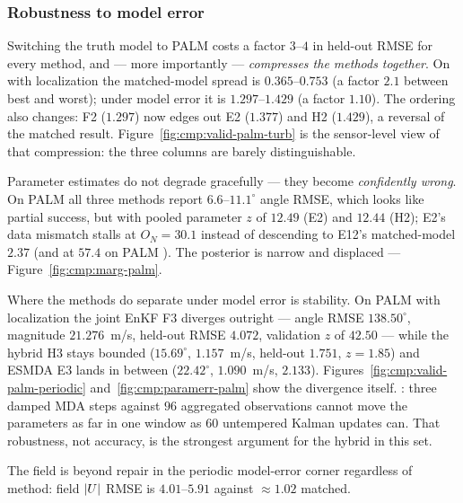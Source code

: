 \subsubsection{Robustness to model error}
\label{sec:cmp:modelerror}

Switching the truth model to PALM costs a factor $3$--$4$ in held-out RMSE for
every method, and --- more importantly --- \emph{compresses the methods
together}. On  with localization the matched-model spread
is $0.365$--$0.753$ (a factor $2.1$ between best and worst); under model error
it is $1.297$--$1.429$ (a factor $1.10$). The ordering also changes: F2
($1.297$) now edges out E2 ($1.377$) and H2 ($1.429$), a reversal of the
matched result. Figure~\ref{fig:cmp:valid-palm-turb} is the sensor-level view
of that compression: the three columns are barely distinguishable. 

Parameter estimates do not degrade gracefully --- they become
\emph{confidently wrong}. On PALM  all three methods report
$6.6$--$11.1^\circ$ angle RMSE, which looks like partial success, but with
pooled parameter $z$ of $12.49$ (E2) and $12.44$ (H2); E2's data mismatch
stalls at $O_N = 30.1$ instead of descending to E12's matched-model $2.37$ (and
at $57.4$ on PALM ). The posterior is narrow and displaced ---
Figure~\ref{fig:cmp:marg-palm}.

Where the methods do separate under model error is stability. On PALM
 with localization the joint EnKF F3 diverges outright --- angle
RMSE $138.50^\circ$, magnitude $21.276$~m/s, held-out RMSE $4.072$, validation
$z$ of $42.50$ --- while the hybrid H3 stays bounded ($15.69^\circ$,
$1.157$~m/s, held-out $1.751$, $z = 1.85$) and ESMDA E3 lands in between
($22.42^\circ$, $1.090$~m/s, $2.133$). Figures~\ref{fig:cmp:valid-palm-periodic}
and~\ref{fig:cmp:paramerr-palm} show the divergence itself. : three damped MDA steps
against $96$ aggregated observations cannot move the parameters as far in one
window as $60$ untempered Kalman updates can. That robustness, not accuracy, is
the strongest argument for the hybrid in this set.

The field is beyond repair in the periodic model-error corner regardless of
method: field $|U|$ RMSE is $4.01$--$5.91$ against $\approx 1.02$ matched.


